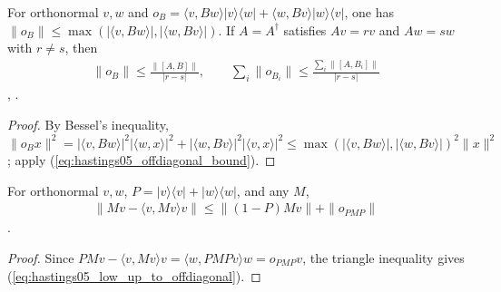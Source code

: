 \begin{lemma}
    \label{thm:hastings05_two_dim_basis}
    \leanok
    For orthonormal $v,w$ and
    $o_B=\langle v,Bw\rangle\lvert v\rangle\langle w\rvert
        +\langle w,Bv\rangle\lvert w\rangle\langle v\rvert$, one has
    $\|o_B\|\le\max(|\langle v,Bw\rangle|,|\langle w,Bv\rangle|)$. If
    $A=A^\dagger$ satisfies $Av=rv$ and $Aw=sw$ with $r\ne s$, then
    \begin{align}
        \|o_B\|\le\frac{\|[A,B]\|}{|r-s|},
        \qquad
        \sum_i\|o_{B_i}\|\le\frac{\sum_i\|[A,B_i]\|}{|r-s|}
        \label{eq:hastings05_two_dim_basis}
    \end{align}
    \cite[lines 1678--1694]{Hastings2006Solving},
    \cite{gap:hastings05_two_dim_ground_basis}.
\end{lemma}
\begin{proof}\leanok
    By Bessel's inequality,
    $\|o_Bx\|^2=|\langle v,Bw\rangle|^2|\langle w,x\rangle|^2
        +|\langle w,Bv\rangle|^2|\langle v,x\rangle|^2
        \le\max(|\langle v,Bw\rangle|,|\langle w,Bv\rangle|)^2\|x\|^2$; apply
    (\ref{eq:hastings05_offdiagonal_bound}).
\end{proof}

\begin{lemma}
    \label{thm:hastings05_low_up_to_offdiagonal}
    \leanok
    For orthonormal $v,w$, $P=\lvert v\rangle\langle v\rvert+\lvert w\rangle\langle w\rvert$,
    and any $M$,
    \begin{align}
        \|Mv-\langle v,Mv\rangle v\|\le\|(1-P)Mv\|+\|o_{PMP}\|
        \label{eq:hastings05_low_up_to_offdiagonal}
    \end{align}
    \cite[eq.~(low), lines 476--491]{Hastings2006Solving}.
\end{lemma}
\begin{proof}\leanok
    Since $PMv-\langle v,Mv\rangle v=\langle w,PMPv\rangle w=o_{PMP}v$, the
    triangle inequality gives (\ref{eq:hastings05_low_up_to_offdiagonal}).
\end{proof}

